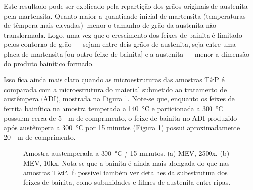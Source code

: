 Este resultado pode ser explicado pela repartição dos grãos originais de austenita pela martensita. Quanto maior a quantidade inicial de martensita (temperaturas de têmpera mais elevadas), menor o tamanho de grão da austenita não transformada. Logo, uma vez que o crescimento dos feixes de bainita é limitado pelos contorno de grão --- sejam entre dois grãos de austenita, seja entre uma placa de martensita [ou outro feixe de bainita] e a austenita --- menor a dimensão do produto bainítico formado.

Isso fica ainda mais claro quando as microestruturas das amostras T\&P é comparada com a microestrutura do material submetido ao tratamento de austêmpera (ADI), mostrada na Figura \ref{fig:ADI300MEV}. Note-se que, enquanto os feixes de ferrita bainítica na amostra temperada a \SI{140}{\degreeCelsius} e particionada a \SI{300}{\degreeCelsius} possuem cerca de \SI{5}{\mu m} de comprimento, o feixe de bainita no ADI produzido após austêmpera a \SI{300}{\degreeCelsius} por 15 minutos (Figura \ref{fig:ADI300MEV}) possui aproximadamente \SI{20}{\mu m} de comprimento.

\begin{figure}
  \centering
  \quad
  \caption{Amostra austemperada a \SI{300}{\degreeCelsius} / 15 minutos. (a) MEV, 2500x. (b) MEV, 10kx. Nota-se que a bainita é ainda mais alongada do que nas amostras T\&P. É possível também ver detalhes da subestrutura dos feixes de bainita, como subunidades e filmes de austenita entre ripas.}
  \label{fig:ADI300MEV}
\end{figure}
